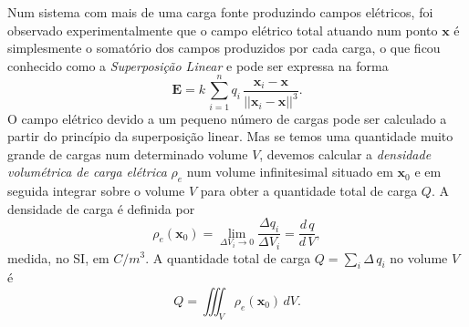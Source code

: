 Num sistema com mais de uma carga fonte produzindo campos elétricos, foi observado experimentalmente que o campo elétrico total atuando num ponto $\textbf{x}$ é simplesmente o somatório dos campos produzidos por cada carga, o que ficou conhecido como a \textit{Superposição Linear} e pode ser expressa na forma
\begin{equation*}
\textbf{E}=k\,\sum_{i=1}^{n}q_i\,\frac{\textbf{x}_i-\textbf{x}}{||\textbf{x}_i-\textbf{x}||^3}.
\end{equation*} 
O campo elétrico devido a um pequeno número de cargas pode ser calculado a partir do princípio da superposição linear. Mas se temos uma quantidade muito grande de cargas num determinado volume $V$, devemos calcular a \textit{densidade volumétrica de carga elétrica} $\rho_e$ num volume infinitesimal situado em $\textbf{x}_0$ e em seguida integrar sobre o volume $V$ para obter a quantidade total de carga $Q$. A densidade de carga é definida por
\begin{equation*}
\rho_e(\textbf{x}_0)=\lim_{\Delta V_i \to 0}\frac{\Delta q_i}{\Delta V_i}=\frac{d\,q}{d\,V},
\end{equation*}
medida, no SI, em $C/m^3$. A quantidade total de carga $Q=\sum_i \Delta\,q_i$ no volume $V$ é
\begin{equation}\label{eq.densidade_carga}
Q=\iiint_{V}\rho_e(\textbf{x}_0)\,dV.
\end{equation}

